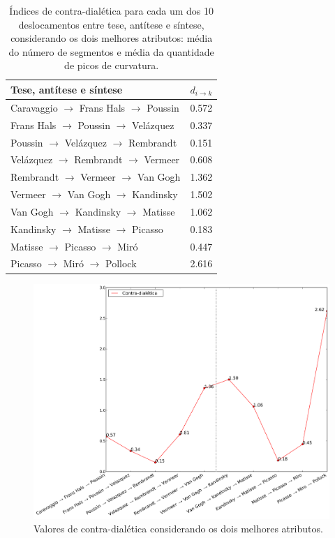 \begin{table}[ht]
  \begin{center}
  \caption{\label{tab:dialetica1} Índices de contra-dialética para cada um dos
    10 deslocamentos entre tese, antítese e síntese, considerando os dois
    melhores atributos: média do número de segmentos e média da quantidade de picos de curvatura.}
\begin{tabular}{@{}ll}
  
    \hline \hline
    \textbf{Tese, antítese e síntese} & \textbf{$d_{i \rightarrow k}$} \\
    \hline
    Caravaggio $\to$ Frans Hals $\to$ Poussin   & 0.572 \\
    Frans Hals $\to$ Poussin $\to$ Velázquez & 0.337 \\
    Poussin $\to$ Velázquez $\to$ Rembrandt  & 0.151 \\
    Velázquez $\to$ Rembrandt $\to$ Vermeer  & 0.608 \\
    Rembrandt $\to$ Vermeer $\to$ Van Gogh      & 1.362 \\
    Vermeer $\to$ Van Gogh $\to$ Kandinsky      & 1.502 \\
    Van Gogh $\to$ Kandinsky $\to$ Matisse      & 1.062 \\
    Kandinsky $\to$ Matisse $\to$ Picasso       & 0.183 \\
    Matisse $\to$ Picasso $\to$ Miró         & 0.447 \\
    Picasso $\to$ Miró $\to$ Pollock         & 2.616 \\
    \hline \hline
  \end{tabular}
  \fonteminha
\end{center}
\end{table}


\begin{figure}[h!]
\begin{center}
       \caption{Valores de contra-dialética considerando os dois melhores atributos.}
        \label{fig:caso1_dialetica}
        \includegraphics[width=\columnwidth]{figs/caso1_dialetica}
        \fonteminha
\end{center}
\end{figure}




